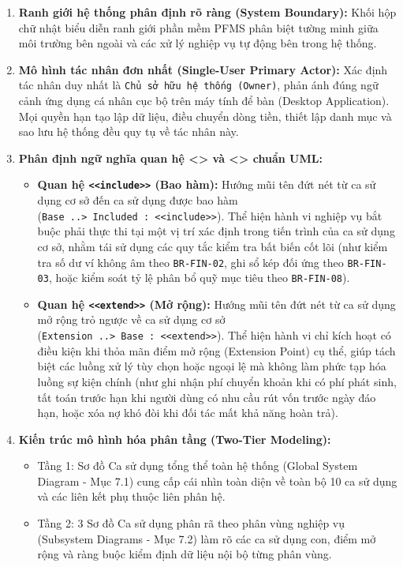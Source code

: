 \documentclass[11pt,a4paper]{article}
\providecommand{\tightlist}{
  \setlength{\itemsep}{0pt}\setlength{\parskip}{0pt}}
\begin{document}
\begin{enumerate}
\def\labelenumi{\arabic{enumi}.}
\tightlist
\item
  \textbf{Ranh giới hệ thống phân định rõ ràng (System Boundary):} Khối
  hộp chữ nhật biểu diễn ranh giới phần mềm PFMS phân biệt tường minh
  giữa môi trường bên ngoài và các xử lý nghiệp vụ tự động bên trong hệ
  thống.
\item
  \textbf{Mô hình tác nhân đơn nhất (Single-User Primary Actor):} Xác
  định tác nhân duy nhất là \texttt{Chủ\ sở\ hữu\ hệ\ thống\ (Owner)},
  phản ánh đúng ngữ cảnh ứng dụng cá nhân cục bộ trên máy tính để bàn
  (Desktop Application). Mọi quyền hạn tạo lập dữ liệu, điều chuyển dòng
  tiền, thiết lập danh mục và sao lưu hệ thống đều quy tụ về tác nhân
  này.
\item
  \textbf{Phân định ngữ nghĩa quan hệ \textless{}\textgreater{} và
  \textless{}\textgreater{} chuẩn UML:}

  \begin{itemize}
  \tightlist
  \item
    \textbf{Quan hệ
    \texttt{\textless{}\textless{}include\textgreater{}\textgreater{}}
    (Bao hàm):} Hướng mũi tên đứt nét từ ca sử dụng cơ sở đến ca sử dụng
    được bao hàm
    (\texttt{Base\ ..\textgreater{}\ Included\ :\ \textless{}\textless{}include\textgreater{}\textgreater{}}).
    Thể hiện hành vi nghiệp vụ bắt buộc phải thực thi tại một vị trí xác
    định trong tiến trình của ca sử dụng cơ sở, nhằm tái sử dụng các quy
    tắc kiểm tra bất biến cốt lõi (như kiểm tra số dư ví không âm theo
    \texttt{BR-FIN-02}, ghi sổ kép đối ứng theo \texttt{BR-FIN-03}, hoặc
    kiểm soát tỷ lệ phân bổ quỹ mục tiêu theo \texttt{BR-FIN-08}).
  \item
    \textbf{Quan hệ
    \texttt{\textless{}\textless{}extend\textgreater{}\textgreater{}}
    (Mở rộng):} Hướng mũi tên đứt nét từ ca sử dụng mở rộng trỏ ngược về
    ca sử dụng cơ sở
    (\texttt{Extension\ ..\textgreater{}\ Base\ :\ \textless{}\textless{}extend\textgreater{}\textgreater{}}).
    Thể hiện hành vi chỉ kích hoạt có điều kiện khi thỏa mãn điểm mở
    rộng (Extension Point) cụ thể, giúp tách biệt các luồng xử lý tùy
    chọn hoặc ngoại lệ mà không làm phức tạp hóa luồng sự kiện chính
    (như ghi nhận phí chuyển khoản khi có phí phát sinh, tất toán trước
    hạn khi người dùng có nhu cầu rút vốn trước ngày đáo hạn, hoặc xóa
    nợ khó đòi khi đối tác mất khả năng hoàn trả).
  \end{itemize}
\item
  \textbf{Kiến trúc mô hình hóa phân tầng (Two-Tier Modeling):}

  \begin{itemize}
  \tightlist
  \item
    Tầng 1: Sơ đồ Ca sử dụng tổng thể toàn hệ thống (Global System
    Diagram - Mục 7.1) cung cấp cái nhìn toàn diện về toàn bộ 10 ca sử
    dụng và các liên kết phụ thuộc liên phân hệ.
  \item
    Tầng 2: 3 Sơ đồ Ca sử dụng phân rã theo phân vùng nghiệp vụ
    (Subsystem Diagrams - Mục 7.2) làm rõ các ca sử dụng con, điểm mở
    rộng và ràng buộc kiểm định dữ liệu nội bộ từng phân vùng.
  \end{itemize}
\end{enumerate}
\end{document}
